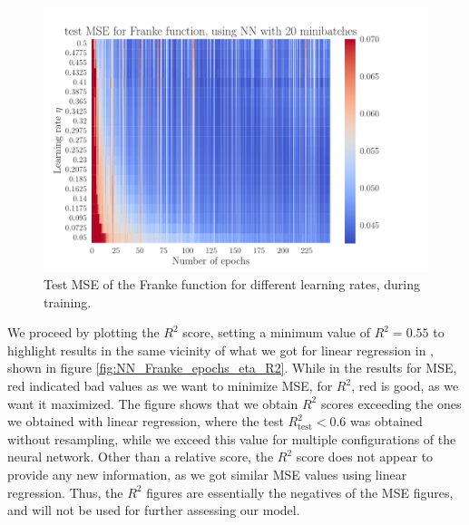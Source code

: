\documentclass[12pt]{extarticle}
\begin{document}
\begin{figure}[h!]
	\includegraphics[width=\linewidth]{NN_Franke/NN_Franke__epochs_eta__test_MSE__582234.pdf}
	\caption{Test MSE of the Franke function for different learning rates, during training.}
	\label{fig:NN_Franke_epochs_eta_MSE_limited}
\end{figure}


We proceed by plotting the $R^2$ score, setting a minimum value of $R^2=0.55$ to highlight results in the same vicinity of what we got for linear regression in \cite{project1}, shown in figure \ref{fig:NN_Franke_epochs_eta_R2}. While in the results for MSE, red indicated bad values as we want to minimize MSE, for $R^2$, red is good, as we want it maximized. The figure shows that we obtain $R^2$ scores exceeding the ones we obtained with linear regression, where the test $R^2_\mathrm{test}<0.6$ was obtained without resampling, while we exceed this value for multiple configurations of the neural network. Other than a relative score, the $R^2$ score does not appear to provide any new information, as we got similar MSE values using linear regression. Thus, the $R^2$ figures are essentially the negatives of the MSE figures, and will not be used for further assessing our model.
\end{document}
